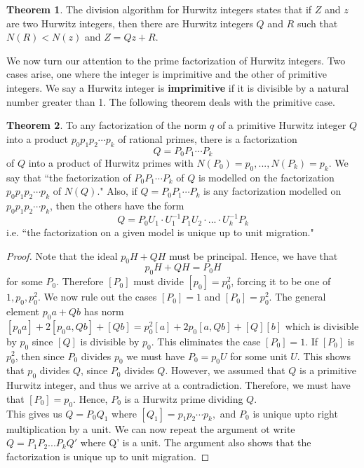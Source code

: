 \documentclass[11pt]{report}
\theoremstyle{plain}
\theoremstyle{definition}
\newtheorem{theorem}{Theorem}
\begin{document}
\begin{theorem}
		The division algorithm for Hurwitz integers states that if $ Z $ and $ z $ are two Hurwitz integers, then there are Hurwitz integers $ Q $ and $ R $ such that $ N(R)< N(z) $ and $ Z=Qz+R $.\\
\textbf{}\end{theorem}
We now turn our attention to the prime factorization of Hurwitz integers. Two cases arise, one where the integer is imprimitive and the other of primitive integers. We say a Hurwitz integer is \textbf{imprimitive} if it is divisible by a natural number greater than 1. The following theorem deals with the primitive case.
\begin{theorem}
	To any factorization of the norm $ q $ of a primitive Hurwitz integer $ Q $ into a product $ p_0 p_1 p_2\cdots p_k $ of rational primes, there is a factorization $$ Q = P_0P_1\cdots P_k $$
	of $ Q $ into a product of Hurwitz primes with $ N(P_0) = p_0, ..., N(P_k) = p_k.$ We say that ``the factorization of $ P_0P_1\cdots P_k $ of $ Q $ is modelled on the factorization $ p_0p_1p_2\cdots p_k $ of $ N(Q) $." Also, if $ Q = P_0P_1\cdots P_k $ is any factorization modelled on $ p_0p_1p_2\cdots p_k $, then the others have the form $$ Q = P_0U_1\cdot U_1^{-1}P_1U_2\cdot ... \cdot U_k^{-1}P_k  $$
i.e. ``the factorization on a given model is unique up to unit migration."
\end{theorem}
\begin{proof}
	Note that the ideal $ p_0H + QH $ must be principal. Hence, we have that
	$$ p_0H+QH = P_0 H$$ for some $ P_0 $. Therefore $ [P_0] $ must divide $ [p_0] = p_0 ^2 $, forcing it to be one of $ 1, p_0, p_0^2 $. We now rule out the cases $ [P_0] = 1 $ and $ [P_0] = p_0 ^2 $. The general element  $ p_0a + Qb $ has norm $ [p_0a]+2[p_0a,Qb]+[Qb] = p_0 ^2[a] + 2p_0[a,Qb] + [Q][b]$ which is divisible by $ p_0 $ since $ [Q] $ is divisible by $ p_0 $. This eliminates the case $ [P_0] =1. $ If $ [P_0] $ is $ p_0 ^2 $, then since $ P_0 $ divides $ p_0 $ we must have $ P_0 = p_0U $ for some unit $ U. $ This shows that $ p_0 $ divides $ Q $, since $ P_0 $ divides $ Q $. However, we assumed that $ Q  $ is a primitive Hurwitz integer, and thus we arrive at a contradiction. Therefore, we must have that $ [P_0] = p_0 $. Hence, $ P_0 $ is a Hurwitz prime dividing  $ Q $. \\
	This gives us $ Q = P_0Q_1 $ where $ [Q_1] = p_1p_2\cdots p_k, $ and $ P_0 $ is unique upto right multiplication by a unit. We can now repeat the argument ot write $ Q = P_1P_2...P_k Q' $ where Q' is a unit. The argument also shows that the factorization is unique up to unit migration.

\end{proof}
\end{document}
